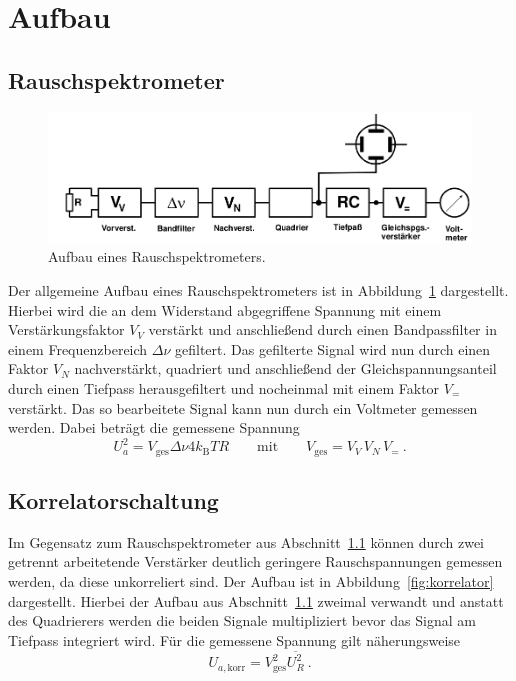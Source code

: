 

\section{Aufbau}

\subsection{Rauschspektrometer}
\label{sub:rauschspektrometer}

\begin{figure}[!htpb]
  \centering
  \includegraphics[scale=0.3]{bilder/spektrometer}
  \caption{Aufbau eines Rauschspektrometers.}
\label{fig:spektrometer}
\end{figure}

Der allgemeine Aufbau eines Rauschspektrometers ist in
Abbildung~\ref{fig:spektrometer} dargestellt.
Hierbei wird die an dem Widerstand abgegriffene Spannung mit einem
Verstärkungsfaktor $V_V$ verstärkt und anschließend durch einen Bandpassfilter
in einem Frequenzbereich $\Delta \nu$ gefiltert.
Das gefilterte Signal wird nun durch einen Faktor $V_N$ nachverstärkt,
quadriert und anschließend der Gleichspannungsanteil durch einen Tiefpass
herausgefiltert und nocheinmal mit einem Faktor $V_=$ verstärkt.
Das so bearbeitete Signal kann nun durch ein Voltmeter gemessen werden.
Dabei beträgt die gemessene Spannung
\begin{equation}
  U_a^2 = V_\text{ges} \Delta\nu 4 k_\text{B}TR \qquad \text{mit}\qquad
  V_\text{ges} = V_V\,V_N\,V_=~.
\end{equation}

\subsection{Korrelatorschaltung}
\label{sub:korrelatorschaltung}

Im Gegensatz zum Rauschspektrometer aus Abschnitt~\ref{sub:rauschspektrometer}
können durch zwei getrennt arbeitetende Verstärker deutlich geringere
Rauschspannungen gemessen werden, da diese unkorreliert sind.
Der Aufbau ist in Abbildung~\ref{fig:korrelator} dargestellt.
Hierbei der Aufbau aus Abschnitt~\ref{sub:rauschspektrometer} zweimal verwandt
und anstatt des Quadrierers werden die beiden Signale multipliziert bevor das
Signal am Tiefpass integriert wird.
Für die gemessene Spannung gilt näherungsweise
\begin{equation}
  U_{a,\text{korr}} = V_\text{ges}^2 \overline{U_R^2}~.
\end{equation}

